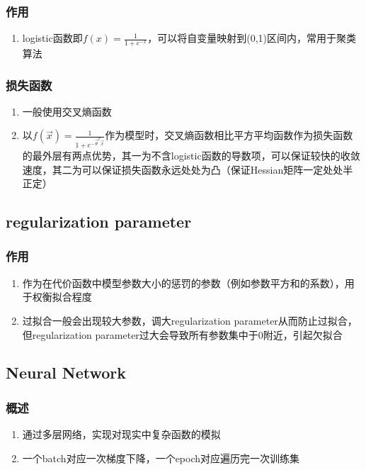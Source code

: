 \documentclass[onecolumn]{article}
\begin{document}
        \subsubsection{作用}
            \noindent
            \begin{enumerate}
                \item logistic函数即$f(x)=\frac{1}{1+e^{-x}}$，可以将自变量映射到(0,1)区间内，常用于聚类算法
            \end{enumerate}
        \subsubsection{损失函数}
            \noindent
            \begin{enumerate}
                \item 一般使用交叉熵函数
                \item 以$f(\vec{x})=\frac{1}{1+e^{-\vec{\theta}^T\vec{x}}}$作为模型时，交叉熵函数相比平方平均函数作为损失函数的最外层有两点优势，其一为不含logistic函数的导数项，可以保证较快的收敛速度，其二为可以保证损失函数永远处处为凸（保证Hessian矩阵一定处处半正定）
            \end{enumerate}
    \subsection{regularization parameter}
        \subsubsection{作用}
            \noindent
            \begin{enumerate}
                \item 作为在代价函数中模型参数大小的惩罚的参数（例如参数平方和的系数），用于权衡拟合程度
                \item 过拟合一般会出现较大参数，调大regularization parameter从而防止过拟合，但regularization parameter过大会导致所有参数集中于0附近，引起欠拟合
            \end{enumerate}
    \subsection{Neural Network}
        \subsubsection{概述}
            \noindent
            \begin{enumerate}
                \item 通过多层网络，实现对现实中复杂函数的模拟
                \item 一个batch对应一次梯度下降，一个epoch对应遍历完一次训练集
            \end{enumerate}
\end{document}
